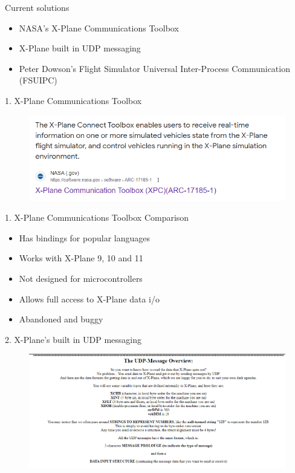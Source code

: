 \documentclass[12pt,aspectratio=169]{beamer}
\begin{document}
\begin{frame}{Current solutions}
\pause
\begin{itemize}
	\item NASA’s X-Plane Communications Toolbox
	\item X-Plane built in UDP messaging
	\item Peter Dowson’s Flight Simulator Universal Inter-Process Communication (FSUIPC)
\end{itemize}
\end{frame}

\begin{frame}{1. X-Plane Communications Toolbox}
	\begin{figure}
		\includegraphics[height=0.5\textheight]{xpc.PNG}
	\end{figure}
\end{frame}

\begin{frame}{1. X-Plane Communications Toolbox}
	Comparison	
	\begin{itemize}
		\item <2-> Has bindings for popular languages
		\item <3-> Works with X-Plane 9, 10 and 11
		\item <4-> Not designed for microcontrollers
		\item <5-> Allows full access to X-Plane data i/o
		\item <6-> Abandoned and buggy
	\end{itemize}
\end{frame}

\begin{frame}{2. X-Plane's built in UDP messaging}
	\begin{figure}
		\includegraphics[height=0.8\textheight]{xplaneudp.PNG}
	\end{figure}
\end{frame}
\end{document}
